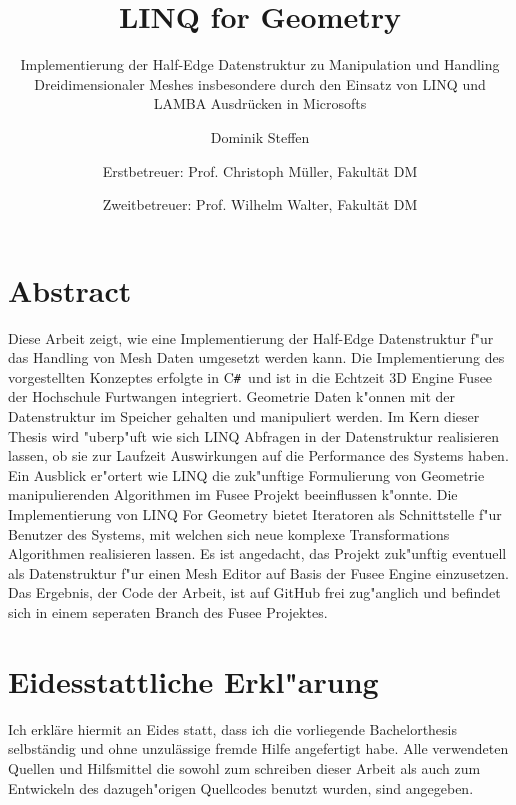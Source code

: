 \documentclass[pagesize, paper=a4, fontsize=12pt,titlepage=true, headings=small, headnosepline, abstractoff, liststotoc, nochapterprefix, plainheadsepline]{scrreprt}
\author{
Dominik Steffen \and
Erstbetreuer: Prof. Christoph Müller, Fakultät DM \and
Zweitbetreuer: Prof. Wilhelm Walter, Fakultät DM
}
\title{LINQ for Geometry}
\subtitle{Implementierung der Half-Edge Datenstruktur zu Manipulation und Handling Dreidimensionaler Meshes insbesondere durch den Einsatz von LINQ und LAMBA Ausdrücken in Microsofts \CS}
\newcommand{\CSS}{C\texttt{\# }}
\newcommand{\LFGS}{LINQ For Geometry }
\begin{document}



\begingroup

\newpage
\pagestyle{empty}
\renewcommand*{\chapterpagestyle}{empty}
\chapter*{Abstract}%
Diese Arbeit zeigt, wie eine Implementierung der Half-Edge Datenstruktur f"ur das Handling von Mesh Daten umgesetzt werden kann. Die Implementierung des vorgestellten Konzeptes erfolgte in \CSS und ist in die Echtzeit 3D Engine Fusee der Hochschule Furtwangen integriert. Geometrie Daten k"onnen mit der Datenstruktur im Speicher gehalten und manipuliert werden. Im Kern dieser Thesis wird "uberp"uft wie sich LINQ Abfragen in der Datenstruktur realisieren lassen, ob sie  zur Laufzeit Auswirkungen auf die Performance des Systems haben. Ein Ausblick er"ortert wie LINQ die zuk"unftige Formulierung von Geometrie manipulierenden Algorithmen im Fusee Projekt beeinflussen k"onnte. Die Implementierung von \LFGS bietet Iteratoren als Schnittstelle f"ur Benutzer des Systems, mit welchen sich neue komplexe Transformations Algorithmen realisieren lassen. Es ist angedacht, das Projekt zuk"unftig eventuell als Datenstruktur f"ur einen Mesh Editor auf Basis der Fusee Engine einzusetzen. Das Ergebnis, der Code der Arbeit, ist auf GitHub frei zug"anglich und befindet sich in einem seperaten Branch des Fusee Projektes.
\clearpage
\endgroup

\begingroup

\newpage
\pagestyle{empty}
\renewcommand*{\chapterpagestyle}{empty}
\chapter*{Eidesstattliche Erkl"arung}%
%
Ich erkläre hiermit an Eides statt, dass ich die vorliegende Bachelorthesis selbständig und ohne 
unzulässige fremde Hilfe angefertigt habe. Alle verwendeten Quellen und Hilfsmittel die sowohl zum schreiben dieser Arbeit als auch zum Entwickeln des dazugeh"origen Quellcodes benutzt wurden, sind angegeben.
\end{document}
